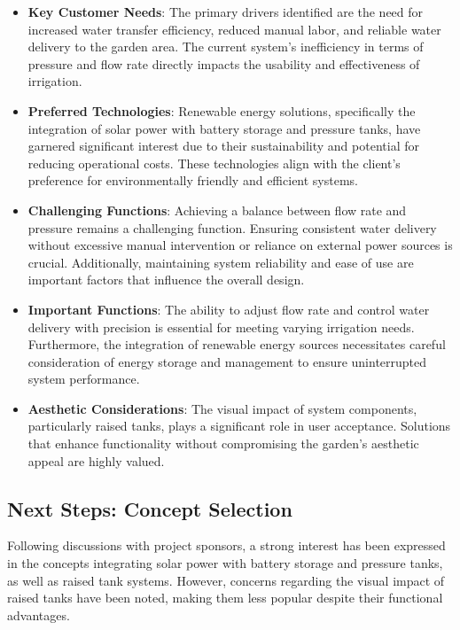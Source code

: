 \documentclass{article}
\begin{document}
\begin{itemize}
    \item \textbf{Key Customer Needs}: The primary drivers identified are the need for increased water transfer efficiency, reduced manual labor, and reliable water delivery to the garden area. The current system's inefficiency in terms of pressure and flow rate directly impacts the usability and effectiveness of irrigation.
    
    \item \textbf{Preferred Technologies}: Renewable energy solutions, specifically the integration of solar power with battery storage and pressure tanks, have garnered significant interest due to their sustainability and potential for reducing operational costs. These technologies align with the client's preference for environmentally friendly and efficient systems.
    
    \item \textbf{Challenging Functions}: Achieving a balance between flow rate and pressure remains a challenging function. Ensuring consistent water delivery without excessive manual intervention or reliance on external power sources is crucial. Additionally, maintaining system reliability and ease of use are important factors that influence the overall design.
    
    \item \textbf{Important Functions}: The ability to adjust flow rate and control water delivery with precision is essential for meeting varying irrigation needs. Furthermore, the integration of renewable energy sources necessitates careful consideration of energy storage and management to ensure uninterrupted system performance.
    
    \item \textbf{Aesthetic Considerations}: The visual impact of system components, particularly raised tanks, plays a significant role in user acceptance. Solutions that enhance functionality without compromising the garden's aesthetic appeal are highly valued.
\end{itemize}

\subsection{Next Steps: Concept Selection}

Following discussions with project sponsors, a strong interest has been expressed in the concepts integrating solar power with battery storage and pressure tanks, as well as raised tank systems. However, concerns regarding the visual impact of raised tanks have been noted, making them less popular despite their functional advantages.
\end{document}
